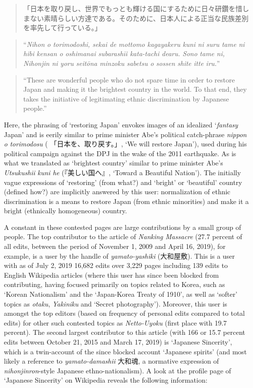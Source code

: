 \documentclass[10pt,british,A4paper,twoside]{memoir}
\begin{document}
\begin{quote}
「日本を取り戻し、世界でもっとも輝ける国にするために日々研鑽を惜しまない素晴らしい方達である。そのために、日本人による正当な民族差別を率先して行っている。」
\end{quote}

\begin{quote}
``\emph{Nihon o torimodoshi, sekai de mottomo kagayakeru kuni ni suru
tame ni hibi kensan o oshimanai subarashīi kata-tachi dearu. Sono tame
ni, Nihonjin ni yoru seitōna minzoku sabetsu o sossen shite itte iru.}''
\end{quote}

\begin{quote}
``These are wonderful people who do not spare time in order to restore
Japan and making it the brightest country in the world. To that end,
they takes the initiative of legitimating ethnic discrimination by
Japanese people.''
\end{quote}

Here, the phrasing of `restoring Japan' envokes images of an idealized
`\emph{fantasy} Japan' and is eerily similar to prime minister Abe's
political catch-phrase \emph{nippon o torimodosu} (
「日本を、取り戻す。」, `We will restore Japan'), used during his
political campaign against the DPJ in the wake of the 2011 earthquake.
As is what we translated as `brightest country' similar to prime
minister Abe's \emph{Utsukushii kuni he} (『美しい国へ』, `Toward a
Beautiful Nation'). The initially vague expressions of `restoring' (from
what?) and `bright' or `beautiful' country (defined how?) are implicitly
answered by this user: normalization of ethnic discrimination is a means
to restore Japan (from ethnic minorities) and make it a bright
(ethnically homogeneous) country.

A constant in these contested pages are large contributions by a small
group of people. The top contributor to the article of \emph{Nanking
Massacre} (27.7 percent of all edits, between the period of November 1,
2009 and April 16, 2019), for example, is a user by the handle of
\emph{yamato-yashiki} (大和屋敷). This is a user with as of July 2, 2019
16,682 edits over 3,229 pages including 139 edits to English Wikipedia
articles (where this user has since been blocked from contributing, having
focused primarily on topics related to Korea, such as `Korean
Nationalism' and the `Japan-Korea Treaty of 1910', as well as `softer'
topics as \emph{otaku}, \emph{Yakiniku} and `Secret photography').
Moreover, this user is amongst the top editors (based on frequency of
personal edits compared to total edits) for other such contested topics
as \emph{Netto-Uyoku} (first place with 19.7 percent). The second
largest contributor to this article (with 166 or 15.7 percent edits
between October 21, 2015 and March 17, 2019) is `Japanese Sincerity',
which is a twin-account of the since blocked account `Japanese spirits'
(and most likely a reference to \emph{yamato-damashii} 大和魂, a
normative expression of \emph{nihonjinron}-style Japanese
ethno-nationalism). A look at the profile page of `Japanese Sincerity'
on Wikipedia reveals the following information:
\end{document}
